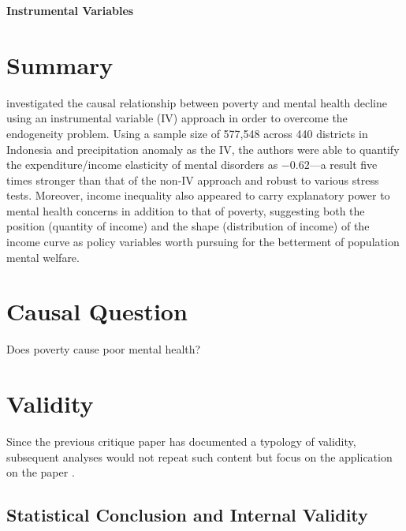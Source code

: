 \begin{center}
    \textbf{Instrumental Variables}
\end{center}

\begin{hangparas}{0.5in}{1}
\end{hangparas}

\bigskip

\section{Summary}

\textcite{hanandita:2014} investigated the causal relationship between poverty and mental health decline using an instrumental variable (IV) approach in order to overcome the endogeneity problem. Using a sample size of 577,548 across 440 districts in Indonesia and precipitation anomaly as the IV, the authors were able to quantify the expenditure/income elasticity of mental disorders as $-0.62$---a result five times stronger than that of the non-IV approach and robust to various stress tests. Moreover, income inequality also appeared to carry explanatory power to mental health concerns in addition to that of poverty, suggesting both the position (quantity of income) and the shape (distribution of income) of the income curve as policy variables worth pursuing for the betterment of population mental welfare.

\section{Causal Question}

Does poverty cause poor mental health?

\section{Validity}

Since the previous critique paper has documented a typology of validity, subsequent analyses would not repeat such content but focus on the application on the paper \textcite{hanandita:2014}.

\subsection{Statistical Conclusion and Internal Validity}

